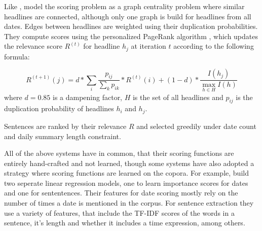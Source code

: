 \documentclass[a4paper,BCOR=10mm]{report}
\numberwithin{lemma}{chapter}
\numberwithin{definition}{chapter}
\begin{document}
Like \citet{yan-trans}, \citet{tran-headlines} model the scoring problem as a graph centrality problem where similar headlines are connected, although only one graph is build for headlines from all dates.
Edges between headlines are weighted using their duplication probabilities.
They compute scores using the personalized PageRank algorithm \citep{topic-sensitive-pagerank}, which updates the relevance score $R^{(t)}$ for headline $h_j$ at iteration $t$ according to the following formula:

\begin{equation}
R^{(t + 1)}(j) = d * \sum_{i} \frac{p_{ij}}{\sum_{k} p_{ik}} * R^{(t)}(i) + (1 - d) * \frac{I(h_j)}{\max_{h \in H} I(h)}
\end{equation}
where $d = 0.85$ is a dampening factor, $H$ is the set of all headlines and $p_{ij}$ is the duplication probability of headlines $h_i$ and $h_j$.

Sentences are ranked by their relevance $R$ and selected greedily under date count and daily summary length constraint.





All of the above systems have in common, that their scoring functions are entirely hand-crafted and not learned, though some systems have also adopted a strategy where scoring functions are learned on the copora.
For example, \citet{tran-headlines} build two seperate linear regression models, one to learn importance scores for dates and one for sententences.
Their features for date scoring mostly rely on the number of times a date is mentioned in the corpus.
For sentence extraction they use a variety of features, that include the TF-IDF scores of the words in a sentence, it's length and whether it includes a time expression, among others.
\end{document}
